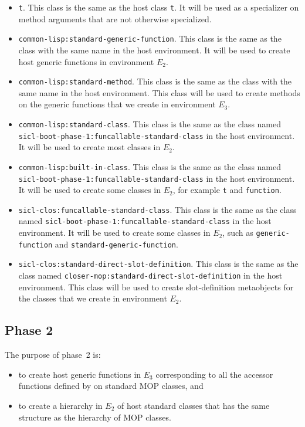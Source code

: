 \begin{itemize}
\item \texttt{t}.  This class is the same as the host class
  \texttt{t}.  It will be used as a specializer on method arguments
  that are not otherwise specialized.
\item \texttt{common-lisp:standard-generic-function}.  This class is
  the same as the class with the same name in the host environment.
  It will be used to create host generic functions in environment
  $E_2$.
\item \texttt{common-lisp:standard-method}.  This class is
  the same as the class with the same name in the host environment.
  This class will be used to create methods on the generic functions
  that we create in environment $E_3$.
\item \texttt{common-lisp:standard-class}.  This class is the same as
  the class named
  \texttt{sicl-boot-phase-1:funcallable-standard-class} in the host
  environment.  It will be used to create most classes in $E_2$.
\item \texttt{common-lisp:built-in-class}.  This class is the same as
  the class named
  \texttt{sicl-boot-phase-1:funcallable-standard-class} in the host
  environment.  It will be used to create some classes in $E_2$, for
  example \texttt{t} and \texttt{function}.
\item \texttt{sicl-clos:funcallable-standard-class}.  This class is
  the same as the class named
  \texttt{sicl-boot-phase-1:funcallable-standard-class} in the host
  environment.  It will be used to create some classes in $E_2$, such
  as \texttt{generic-function} and \texttt{standard-generic-function}.
\item \texttt{sicl-clos:standard-direct-slot-definition}.  This class
  is the same as the class named
  \texttt{closer-mop:standard-direct-slot-definition} in the host
  environment.  This class will be used to create slot-definition
  metaobjects for the classes that we create in environment $E_2$.
\end{itemize}

\subsection{Phase 2}

The purpose of phase~2 is:

\begin{itemize}
\item to create host generic functions in $E_3$ corresponding to all
  the accessor functions defined by \sysname{} on standard MOP
  classes, and
\item to create a hierarchy in $E_2$ of host standard classes that has
  the same structure as the hierarchy of MOP classes.
\end{itemize}


